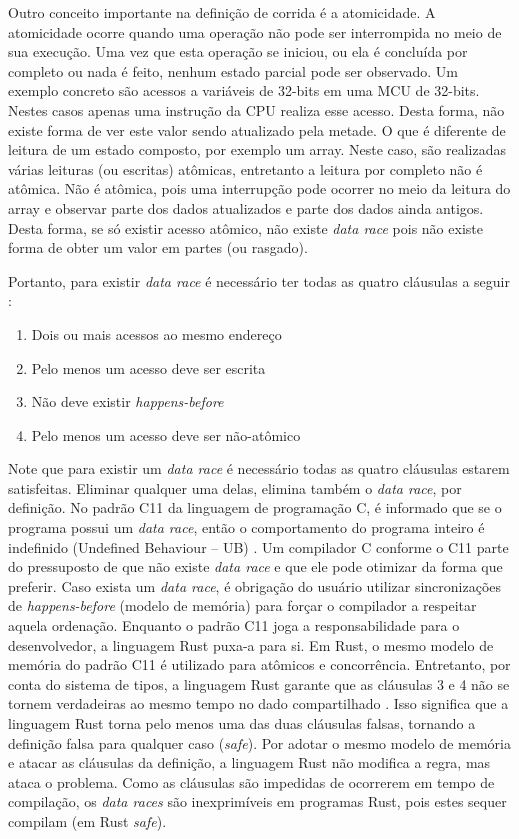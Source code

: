 Outro conceito importante na definição de corrida é a atomicidade. A atomicidade ocorre quando uma operação não pode ser interrompida no meio de sua execução. Uma vez que esta operação se iniciou, ou ela é concluída por completo ou nada é feito, nenhum estado parcial pode ser observado. Um exemplo concreto são acessos a variáveis de 32-bits em uma \ac{MCU} de 32-bits. Nestes casos apenas uma instrução da \ac{CPU} realiza esse acesso. Desta forma, não existe forma de ver este valor sendo atualizado pela metade. O que é diferente de leitura de um estado composto, por exemplo um array. Neste caso, são realizadas várias leituras (ou escritas) atômicas, entretanto a leitura por completo não é atômica. Não é atômica, pois uma interrupção pode ocorrer no meio da leitura do array e observar parte dos dados atualizados e parte dos dados ainda antigos. Desta forma, se só existir acesso atômico, não existe \textit{data race} pois não existe forma de obter um valor em partes (ou rasgado).

Portanto, para existir \textit{data race} é necessário ter todas as quatro cláusulas a seguir \citep{doc:c11}:

\begin{enumerate}
    \item Dois ou mais acessos ao mesmo endereço
    \item Pelo menos um acesso deve ser escrita
    \item Não deve existir \textit{happens-before}
    \item Pelo menos um acesso deve ser não-atômico
\end{enumerate}

Note que para existir um \textit{data race} é necessário todas as quatro cláusulas estarem satisfeitas. Eliminar qualquer uma delas, elimina também o \textit{data race}, por definição. No padrão C11 da linguagem de programação C, é informado que se o programa possui um \textit{data race}, então o comportamento do programa inteiro é indefinido (Undefined Behaviour -- UB) \citep{doc:c11}. Um compilador C conforme o C11 parte do pressuposto de que não existe \textit{data race} e que ele pode otimizar da forma que preferir. Caso exista um \textit{data race}, é obrigação do usuário utilizar sincronizações de \textit{happens-before} (modelo de memória) para forçar o compilador a respeitar aquela ordenação. Enquanto o padrão C11 joga a responsabilidade para o desenvolvedor, a linguagem Rust puxa-a para si. Em Rust, o mesmo modelo de memória do padrão C11 é utilizado para atômicos e concorrência. Entretanto, por conta do sistema de tipos, a linguagem Rust garante que as cláusulas 3 e 4 não se tornem verdadeiras ao mesmo tempo no dado compartilhado \citep{article:rust-safe-soundness}. Isso significa que a linguagem Rust torna pelo menos uma das duas cláusulas falsas, tornando a definição falsa para qualquer caso (\textit{safe}). Por adotar o mesmo modelo de memória e atacar as cláusulas da definição, a linguagem Rust não modifica a regra, mas ataca o problema. Como as cláusulas são impedidas de ocorrerem em tempo de compilação, os \textit{data races} são inexprimíveis em programas Rust, pois estes sequer compilam (em Rust \textit{safe}).


